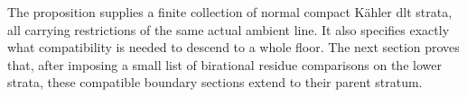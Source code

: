The proposition supplies a finite collection of normal compact K\"ahler
dlt strata, all carrying restrictions of the same actual ambient line.
It also specifies exactly what compatibility is needed to descend to a
whole floor.  The next section proves that, after imposing a small list of
birational residue comparisons on the lower strata, these compatible
boundary sections extend to their parent stratum.
